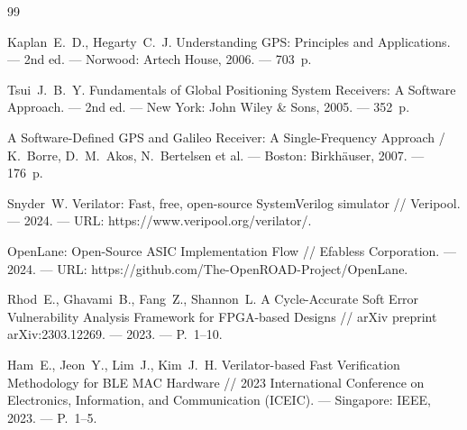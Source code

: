 \begin{thebibliography}{99}

 Kaplan~E.~D., Hegarty~C.~J. Understanding GPS: Principles and Applications. --- 2nd ed. --- Norwood: Artech House, 2006. --- 703~p.

 Tsui~J.~B.~Y. Fundamentals of Global Positioning System Receivers: A Software Approach. --- 2nd ed. --- New York: John Wiley \& Sons, 2005. --- 352~p.

 A Software-Defined GPS and Galileo Receiver: A Single-Frequency Approach / K.~Borre, D.~M.~Akos, N.~Bertelsen et al. --- Boston: Birkh{\"a}user, 2007. --- 176~p.

 Snyder~W. Verilator: Fast, free, open-source SystemVerilog simulator // Veripool. --- 2024. --- URL: https://www.veripool.org/verilator/.

 OpenLane: Open-Source ASIC Implementation Flow // Efabless Corporation. --- 2024. --- URL: https://github.com/The-OpenROAD-Project/OpenLane.

 Rhod~E., Ghavami~B., Fang~Z., Shannon~L. A Cycle-Accurate Soft Error Vulnerability Analysis Framework for FPGA-based Designs // arXiv preprint arXiv:2303.12269. --- 2023. --- P.~1--10.

 Ham~E., Jeon~Y., Lim~J., Kim~J.~H. Verilator-based Fast Verification Methodology for BLE MAC Hardware // 2023 International Conference on Electronics, Information, and Communication (ICEIC). --- Singapore: IEEE, 2023. --- P.~1--5.

\end{thebibliography}
